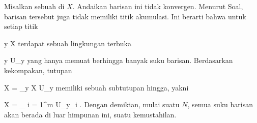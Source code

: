Misalkan
 sebuah
di $X$. Andaikan barisan ini tidak konvergen. Menurut
Soal,
barisan tersebut juga tidak memiliki titik akumulasi. Ini berarti bahwa untuk setiap titik

\mavergleichskette
{\vergleichskette
{ y
}
{ \in }{ X
}
{  }{
}
{    }{
}
{   }{
}
}
{}{}{}
terdapat sebuah lingkungan terbuka

\mavergleichskette
{\vergleichskette
{ y
}
{ \in }{ U_y
}
{  }{
}
{    }{
}
{   }{
}
}
{}{}{}
yang hanya memuat berhingga banyak suku barisan. Berdasarkan kekompakan, tutupan

\mavergleichskettedisp
{\vergleichskette
{ X
}
{ =} { \bigcup_{y \in X} U_y
}
{ } {
}
{ } {
}
{ } {
}
}
{}{}{}
memiliki sebuah subtutupan hingga, yakni

\mavergleichskettedisp
{\vergleichskette
{ X
}
{ =} { \bigcup_{ i = 1}^m  U_{y_i }
}
{ } {
}
{ } {
}
{ } {
}
}
{}{}{.}
Dengan demikian, mulai suatu $N$, semua suku barisan akan berada di luar himpunan ini, suatu kemustahilan.
